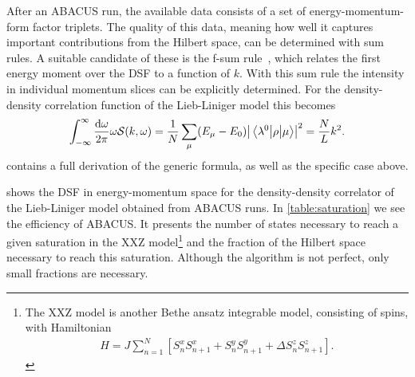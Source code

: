 \documentclass[11pt, a4paper]{report} %
\begin{document}
After an ABACUS run, the available data consists of a set of energy-momentum-form factor triplets.
The quality of this data, meaning how well it captures important contributions from the Hilbert space, can be determined with sum rules.
A suitable candidate of these is the f-sum rule~\cite{Caux2007a}, which relates the first energy moment over the DSF to a function of \(k\).
With this sum rule the intensity in individual momentum slices can be explicitly determined.
For the density-density correlation function of the Lieb-Liniger model this becomes
\begin{align}
  \label{eq:fsumrule}
  \int_{-\infty}^{\infty} \frac{\dd \omega}{2\pi} \omega \mathcal{S}(k, \omega) = \frac{1}{N}\sum_{\mu}(E_{\mu}-E_0)\abs{\mel{\lambda^0}{\rho}{\mu}}^2  = \frac{N}{L} k^2.
\end{align}
 contains a full derivation of the generic formula, as well as the specific case above.

 shows the DSF in energy-momentum space for the density-density correlator of the Lieb-Liniger model obtained from ABACUS runs.
In \cref{table:saturation} we see the efficiency of ABACUS.
It presents the number of states necessary to reach a given saturation in the XXZ model\footnote{The XXZ model is another Bethe ansatz integrable model, consisting of spins, with Hamiltonian~\cite{Franchini2017}
    \begin{align}
      \label{eq:53}
      H =  J \sum_{n=1}^N\left[S_{n}^x S_{n+1}^x+S_n^y S_{n+1}^y + \Delta S_n^z S_{n+1}^z\right].
    \end{align}
} and the fraction of the Hilbert space necessary to reach this saturation.
Although the algorithm is not perfect, only small fractions are necessary.
\end{document}
